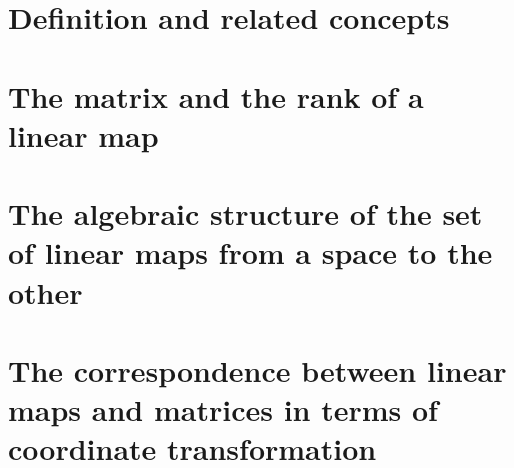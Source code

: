 \documentclass[onecolumn]{ctexart}
\begin{document}
\section{Definition and related concepts}

\section{The matrix and the rank of a linear map}

\section{The algebraic structure of the set of linear maps from a space to the other}

\section{The correspondence between linear maps and matrices in terms of coordinate transformation}
\end{document}
